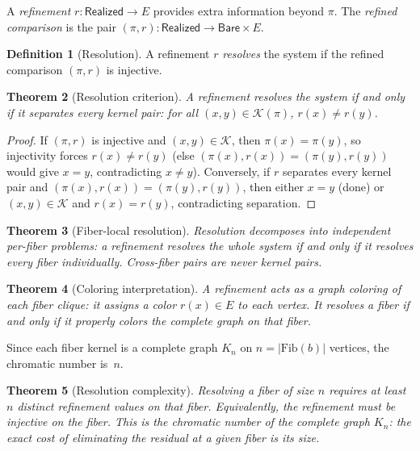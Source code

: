 \documentclass[11pt,a4paper]{article}
\theoremstyle{plain}
\newtheorem{theorem}{Theorem}[section]
\theoremstyle{definition}
\newtheorem{definition}[theorem]{Definition}
\theoremstyle{remark}
\newcommand{\Bare}{\mathsf{Bare}}
\newcommand{\Real}{\mathsf{Realized}}
\newcommand{\compare}{\pi}
\newcommand{\Fib}{\mathrm{Fib}}
\newcommand{\Ker}{\mathcal{K}}
\begin{document}
A \emph{refinement} $r : \Real \to E$ provides extra information beyond
$\compare$. The \emph{refined comparison} is the pair
$(\compare, r) : \Real \to \Bare \times E$.

\begin{definition}[Resolution]\label{def:resolution}
A refinement $r$ \emph{resolves} the system if the refined comparison
$(\compare, r)$ is injective.
\end{definition}

\begin{theorem}[Resolution criterion]\label{thm:resolution}
A refinement resolves the system if and only if it separates every kernel pair:
for all $(x,y) \in \Ker(\compare)$, $r(x) \neq r(y)$.
\end{theorem}

\begin{proof}
If $(\compare, r)$ is injective and $(x,y) \in \Ker$, then
$\compare(x) = \compare(y)$, so injectivity forces $r(x) \neq r(y)$
(else $(\compare(x), r(x)) = (\compare(y), r(y))$ would give $x = y$,
contradicting $x \neq y$). Conversely, if $r$ separates every kernel pair
and $(\compare(x), r(x)) = (\compare(y), r(y))$, then either $x = y$
(done) or $(x,y) \in \Ker$ and $r(x) = r(y)$, contradicting separation.
\end{proof}

\begin{theorem}[Fiber-local resolution]\label{thm:local-res}
Resolution decomposes into independent per-fiber problems: a refinement
resolves the whole system if and only if it resolves every fiber individually.
Cross-fiber pairs are never kernel pairs.
\end{theorem}

\begin{theorem}[Coloring interpretation]\label{thm:coloring}
A refinement acts as a graph coloring of each fiber clique: it assigns
a color $r(x) \in E$ to each vertex. It resolves a fiber if and only
if it properly colors the complete graph on that fiber.
\end{theorem}

Since each fiber kernel is a complete graph $K_n$ on $n = |\Fib(b)|$ vertices,
the chromatic number is~$n$.

\begin{theorem}[Resolution complexity]\label{thm:res-complex}
Resolving a fiber of size $n$ requires at least $n$ distinct refinement values
on that fiber. Equivalently, the refinement must be injective on the fiber.
This is the chromatic number of the complete graph $K_n$: the exact cost of
eliminating the residual at a given fiber is its size.
\end{theorem}
\end{document}
